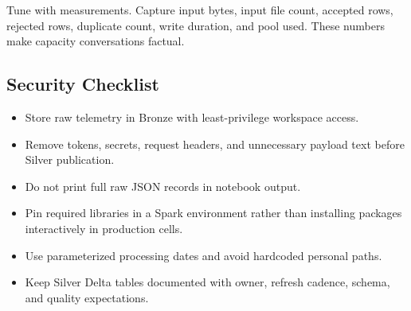 \begin{tipbox}
Tune with measurements. Capture input bytes, input file count, accepted rows, rejected rows, duplicate count, write duration, and pool used. These numbers make capacity conversations factual.
\end{tipbox}

\subsection{Security Checklist}
\begin{itemize}
    \item Store raw telemetry in Bronze with least-privilege workspace access.
    \item Remove tokens, secrets, request headers, and unnecessary payload text before Silver publication.
    \item Do not print full raw JSON records in notebook output.
    \item Pin required libraries in a Spark environment rather than installing packages interactively in production cells.
    \item Use parameterized processing dates and avoid hardcoded personal paths.
    \item Keep Silver Delta tables documented with owner, refresh cadence, schema, and quality expectations.
\end{itemize}

